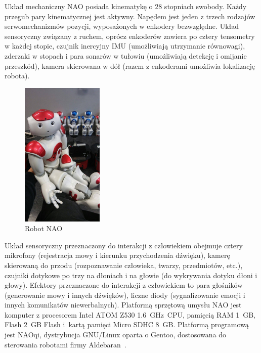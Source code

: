 Układ mechaniczny NAO posiada kinematykę o 28 stopniach swobody. Każdy przegub pary kinematycznej jest aktywny. Napędem jest jeden z trzech rodzajów serwomechanizmów pozycji, wyposażonych w enkodery bezwzględne. Układ sensoryczny związany z ruchem, oprócz enkoderów zawiera po cztery tensometry w każdej stopie, czujnik inercyjny IMU (umożliwiają utrzymanie równowagi), zderzaki w stopach i para sonarów w tułowiu (umożliwiają detekcję i omijanie przeszkód), kamera skierowana w dół (razem z enkoderami umożliwia lokalizację robota). 

\begin{figure}
    \centering
    \includegraphics[width=0.35\textwidth]{images/nao.jpg}
    \caption{Robot NAO}
    \label{fig:NAO}
\end{figure}
Układ sensoryczny przeznaczony do interakcji z człowiekiem obejmuje cztery mikrofony (rejestracja mowy i kierunku przychodzenia dźwięku), kamerę skierowaną do przodu (rozpoznawanie człowieka, twarzy, przedmiotów, etc.), czujniki dotykowe po trzy na dłoniach i na głowie (do wykrywania dotyku dłoni i głowy). Efektory przeznaczone do interakcji z człowiekiem to para głośników (generowanie mowy i innych dźwięków), liczne diody (sygnalizowanie emocji i innych komunikatów niewerbalnych). Platformą sprzętową umysłu NAO jest komputer z procesorem Intel ATOM Z530 1.6~GHz~CPU, pamięcią RAM 1~GB, Flash 2~GB Flash i~kartą pamięci Micro SDHC 8~GB. Platformą programową jest NAOqi, dystrybucja GNU/Linux oparta o Gentoo, dostosowana do sterowania robotami firmy Aldebaran~\cite{NAOqi}.

